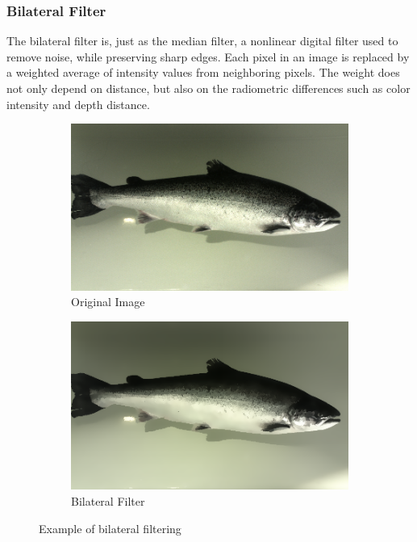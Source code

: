 \subsubsection{Bilateral Filter}
The bilateral filter is, just as the median filter, a nonlinear digital filter used to remove noise, while preserving sharp edges. Each pixel in an image is replaced by a weighted average of intensity values from neighboring pixels. The weight does not only depend on distance, but also on the radiometric differences such as color intensity and depth distance.\cite{book:digital_image_processing}\cite{website:wiki_bilateral_filter}\cite{book:machine_vision}

\begin{figure}[h]
    \centering
    \begin{subfigure}{0.5\textwidth}
        \centering
        \includegraphics[width=.99\linewidth]{images/literature/filtering/original_fish}
        \caption{Original Image}
    \end{subfigure}%
    \begin{subfigure}{.5\textwidth}
        \centering
        \includegraphics[width=.99\linewidth]{images/literature/filtering/bilateral}
        \caption{Bilateral Filter}
        \label{fig:bilateral_filter_b}
    \end{subfigure}
    \caption{Example of bilateral filtering}
    \label{fig:bilateral_filter}
\end{figure}

